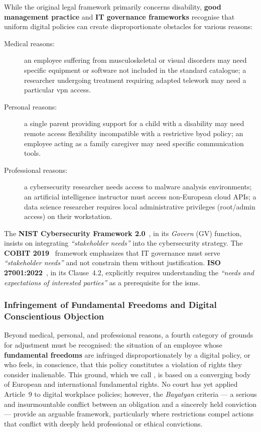 \medskip

While the original legal framework primarily concerns disability,
\textbf{good management practice} and \textbf{IT governance
frameworks} recognise that uniform digital policies
can create disproportionate obstacles for various
reasons:

\begin{description}
    \item[Medical reasons:] an employee suffering from musculoskeletal
    or visual disorders may need specific equipment
    or software not included in the standard catalogue;
    a researcher undergoing treatment requiring adapted telework may
    need a particular \gls{vpn} access.

    \item[Personal reasons:] a single parent providing
    support for a child with a disability may need
    remote access flexibility incompatible with a restrictive
    \gls{byod} policy; an employee acting as a family caregiver may
    need specific communication tools.

    \item[Professional reasons:] a cybersecurity researcher
    needs access to malware analysis environments; an
    artificial intelligence instructor must access non-European cloud APIs;
    a data science researcher requires
    local administrative privileges (root/admin access) on their workstation.
\end{description}

The \textbf{NIST Cybersecurity Framework 2.0}~\cite{nist-csf}, in
its \emph{Govern} (GV) function, insists on integrating
\emph{``stakeholder needs''} into the cybersecurity
strategy. The \textbf{COBIT 2019}~\cite{cobit} framework emphasizes
that IT governance must serve \emph{``stakeholder
needs''} and not constrain them without
justification. \textbf{ISO 27001:2022}~\cite{iso27001}, in its
Clause~4.2, explicitly requires understanding the
\emph{``needs and expectations of interested parties''} as a prerequisite
for the \gls{isms}.

\subsubsection{Infringement of Fundamental Freedoms and Digital Conscientious Objection}

Beyond medical, personal, and professional reasons, a
fourth category of grounds for adjustment must be recognised: the
situation of an employee whose \textbf{fundamental freedoms} are
infringed disproportionately by a digital policy, or
who feels, in conscience, that this policy constitutes a violation
of rights they consider inalienable. This ground, which we
call , is based on
a converging body of European and international fundamental rights.
No court has yet applied Article~9 to digital workplace policies;
however, the \emph{Bayatyan} criteria --- a serious and insurmountable
conflict between an obligation and a sincerely held conviction ---
provide an arguable framework, particularly where restrictions compel
actions that conflict with deeply held professional or ethical
convictions.

